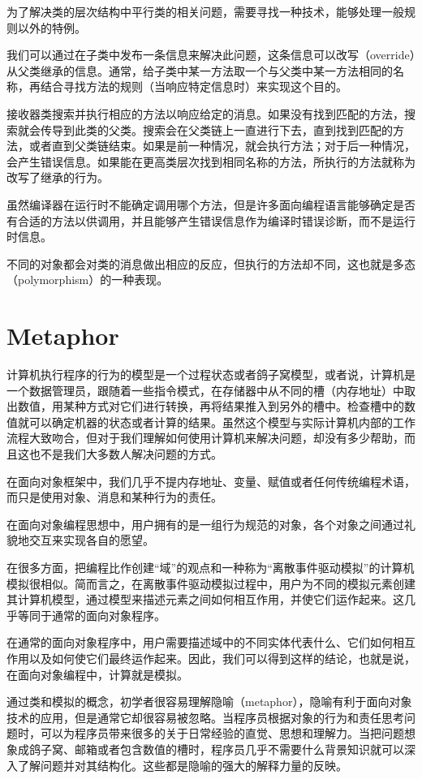 为了解决类的层次结构中平行类的相关问题，需要寻找一种技术，能够处理一般规则以外的特例。

我们可以通过在子类中发布一条信息来解决此问题，这条信息可以改写（override）从父类继承的信息。通常，给子类中某一方法取一个与父类中某一方法相同的名称，再结合寻找方法的规则（当响应特定信息时）来实现这个目的。

接收器类搜索并执行相应的方法以响应给定的消息。如果没有找到匹配的方法，搜索就会传导到此类的父类。搜索会在父类链上一直进行下去，直到找到匹配的方法，或者直到父类链结束。如果是前一种情况，就会执行方法；对于后一种情况，会产生错误信息。如果能在更高类层次找到相同名称的方法，所执行的方法就称为改写了继承的行为。

虽然编译器在运行时不能确定调用哪个方法，但是许多面向编程语言能够确定是否有合适的方法以供调用，并且能够产生错误信息作为编译时错误诊断，而不是运行时信息。

不同的对象都会对类的消息做出相应的反应，但执行的方法却不同，这也就是多态（polymorphism）的一种表现。



\chapter{Metaphor}



计算机执行程序的行为的模型是一个过程状态或者鸽子窝模型，或者说，计算机是一个数据管理员，跟随着一些指令模式，在存储器中从不同的槽（内存地址）中取出数值，用某种方式对它们进行转换，再将结果推入到另外的槽中。检查槽中的数值就可以确定机器的状态或者计算的结果。虽然这个模型与实际计算机内部的工作流程大致吻合，但对于我们理解如何使用计算机来解决问题，却没有多少帮助，而且这也不是我们大多数人解决问题的方式。

在面向对象框架中，我们几乎不提内存地址、变量、赋值或者任何传统编程术语，而只是使用对象、消息和某种行为的责任。

在面向对象编程思想中，用户拥有的是一组行为规范的对象，各个对象之间通过礼貌地交互来实现各自的愿望。


在很多方面，把编程比作创建“域”的观点和一种称为“离散事件驱动模拟”的计算机模拟很相似。简而言之，在离散事件驱动模拟过程中，用户为不同的模拟元素创建其计算机模型，通过模型来描述元素之间如何相互作用，并使它们运作起来。这几乎等同于通常的面向对象程序。

在通常的面向对象程序中，用户需要描述域中的不同实体代表什么、它们如何相互作用以及如何使它们最终运作起来。因此，我们可以得到这样的结论，也就是说，在面向对象编程中，计算就是模拟。


通过类和模拟的概念，初学者很容易理解隐喻（metaphor），隐喻有利于面向对象技术的应用，但是通常它却很容易被忽略。当程序员根据对象的行为和责任思考问题时，可以为程序员带来很多的关于日常经验的直觉、思想和理解力。当把问题想象成鸽子窝、邮箱或者包含数值的槽时，程序员几乎不需要什么背景知识就可以深入了解问题并对其结构化。这些都是隐喻的强大的解释力量的反映。


